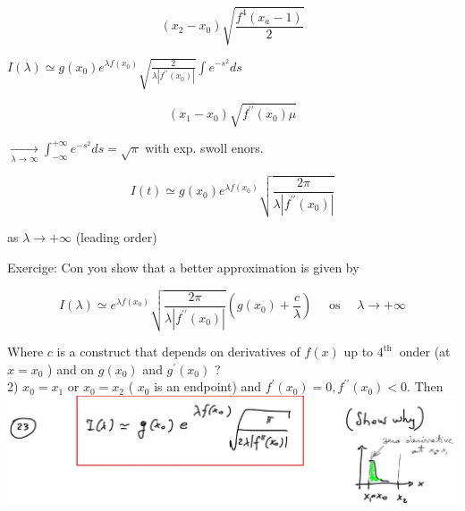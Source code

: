 \documentclass[10pt]{article}
\begin{document}
$$
\left(x_{2}-x_{0}\right) \sqrt{\frac{f^{4}\left(x_{a}-1\right)}{2}}
$$

$I(\lambda) \simeq g\left(x_{0}\right) e^{\lambda f\left(x_{0}\right)} \sqrt{\frac{2}{\lambda\left|f^{\prime \prime}\left(x_{0}\right)\right|}} \int e^{-s^{2}} d s$

$$
\left(x_{1}-x_{0}\right) \sqrt{f^{\prime \prime}\left(x_{0}\right) \mu}
$$

$\xrightarrow[\lambda \rightarrow \infty]{ } \int_{-\infty}^{+\infty} e^{-s^{2}} d s=\sqrt{\pi}$ with exp. swoll enors.

$$
I(t) \simeq g\left(x_{0}\right) e^{\lambda f\left(x_{0}\right)} \sqrt{\frac{2 \pi}{\lambda\left|f^{\prime \prime}\left(x_{0}\right)\right|}}
$$

as $\lambda \rightarrow+\infty$ (leading order)

Exercige: Con you show that a better approximation is given by

$$
I(\lambda) \simeq e^{\lambda f\left(x_{0}\right)} \sqrt{\frac{2 \pi}{\lambda\left|f^{\prime \prime}\left(x_{0}\right)\right|}}\left(g\left(x_{0}\right)+\frac{c}{\lambda}\right) \quad \text { os } \quad \lambda \rightarrow+\infty
$$

Where $c$ is a construct that depends on derivatives of $f(x)$ up to $4^{\text {th }}$ onder (at $x=x_{0}$ ) and on $g\left(x_{0}\right)$ and $g^{\prime}\left(x_{0}\right)$ ?\\
2) $x_{0}=x_{1}$ or $x_{0}=x_{2}$ ( $x_{0}$ is an endpoint) and $f^{\prime}\left(x_{0}\right)=0, f^{\prime \prime}\left(x_{0}\right)<0$. Then\\
\includegraphics[max width=\textwidth, center]{2025_10_17_86b952e516931f75c0b7g-06}
\end{document}
